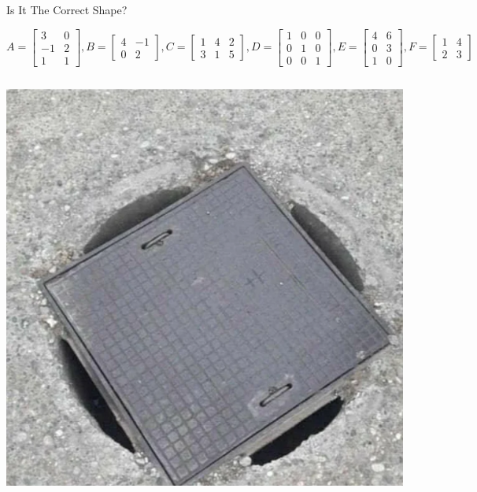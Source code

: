\documentclass[xcoler=dvipsnames, aspectratio=169]{beamer}
\begin{document}
    \begin{frame}{Is It The Correct Shape?}

        {\scriptsize
        \[
            A=\begin{bmatrix}3&0\\-1&2\\1&1\end{bmatrix}, B=\begin{bmatrix}4&-1\\0&2\end{bmatrix},
            C=\begin{bmatrix}1&4&2\\3&1&5\end{bmatrix}, D = \begin{bmatrix}1&0&0\\0&1&0\\0&0&1\end{bmatrix},
            E=\begin{bmatrix}4&6\\0&3\\1&0\end{bmatrix}, F=\begin{bmatrix}1&4\\2&3\end{bmatrix}
        \]}
        \begin{columns}
                \includegraphics[scale=.125]{images/manhole.png}

\end{columns}
\end{frame}
\end{document}
